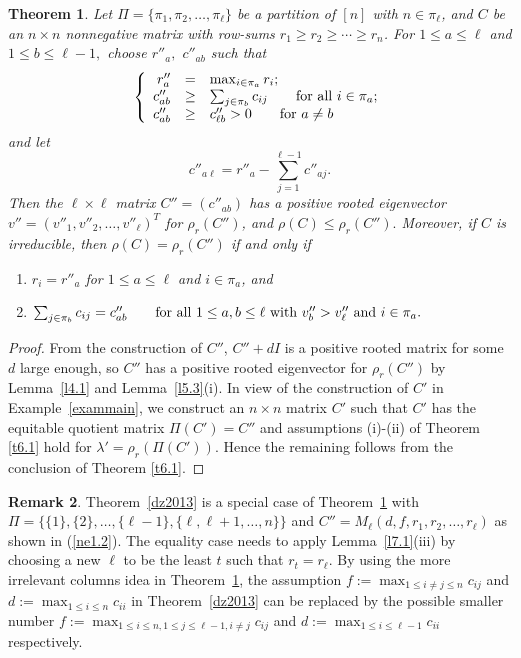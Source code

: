 \documentclass[final,3p, times, 12pt]{elsarticle}
\theoremstyle{plain}
\newtheorem{thm}{Theorem}[section]
\theoremstyle{definition}
\newtheorem{rem}[thm]{Remark}
\theoremstyle{remark}
\numberwithin{equation}{section}
\begin{document}
\begin{thm}\label{main3}
Let  $\Pi=\{\pi_1, \pi_2, \ldots, \pi_\ell\}$ be a partition of $[n]$ with $n\in \pi_\ell$, and
$C$ be an $n\times n$ nonnegative matrix with row-sums $r_1\geq r_2\geq \cdots \geq r_n$.
For $1\leq a \leq \ell$ and $1\leq b\leq \ell-1,$
choose  $r''_a,$ $c''_{ab}$ such that
$$
\left\{
\begin{array}{rcl}
r''_a&=&\max_{i\in \pi_a} r_i;\\
c''_{ab}   &\geq&\sum_{j\in \pi_b} c_{ij}\qquad \hbox{for all } i\in \pi_a;\\
c''_{ab}   &\geq& c''_{\ell b}> 0 \qquad \hbox{for } a\not=b
\end{array}
\right.$$
and let
$$c''_{a\ell}=r''_a-\sum_{j=1}^{\ell-1} c''_{aj}.$$
Then the $\ell\times\ell$ matrix $C''=(c''_{ab})$  has a positive rooted eigenvector $v''=(v''_1, v''_2, \ldots, v''_\ell)^T$ for $\rho_r(C'')$,
and  $\rho(C)\leq \rho_r(C'').$
Moreover, if $C$ is irreducible, then $\rho(C)= \rho_r(C'')$ if and only if
\begin{enumerate}
\item[(a)] $r_i=r''_a$ \qquad for $1\leq a\leq \ell$ and $i\in \pi_a$, and
\item[(b)]
$\sum_{j\in \pi_b}c_{ij} =c''_{ab}\qquad \hbox{for all $1\leq a, b\leq \ell$ with $v''_b>v''_\ell$ and  $i\in \pi_a$}.$
\end{enumerate}
\end{thm}

\begin{proof} From the construction of $C''$,
$C''+dI$ is a positive rooted matrix for some $d$ large enough, so $C''$ has a positive rooted eigenvector for $\rho_r(C'')$ by Lemma~\ref{l4.1} and Lemma~\ref{l5.3}(i).
In view of the construction of $C'$ in Example~\ref{exammain}, we construct an $n\times n$ matrix $C'$ such that $C'$ has the equitable quotient matrix $\Pi(C')=C''$ and assumptions (i)-(ii) of Theorem \ref{t6.1} hold for $\lambda'=\rho_r(\Pi(C'))$.
Hence the remaining follows from the conclusion of Theorem \ref{t6.1}.
\end{proof}

\begin{rem}
Theorem~\ref{dz2013} is a special case  of Theorem~\ref{main3} with $\Pi=\{\{1\}, \{2\}, \ldots, \{\ell-1\}, \{\ell, \ell+1, \ldots, n\}\}$ and $C''=M_{\ell}(d,f,r_1,r_2,\ldots,r_\ell)$ as shown in (\ref{ne1.2}). The equality case needs to apply Lemma~\ref{l7.1}(iii) by choosing a new $\ell$ to be the least $t$ such that $r_t=r_\ell$.
By using the more irrelevant columns idea in Theorem~\ref{main3}, the assumption  $f:=\max_{1\leq i\not=j\leq n} c_{ij}$ and $d:=\max_{1\leq i\leq n}c_{ii}$ in Theorem~\ref{dz2013} can be replaced by the possible smaller number $f:=\max_{1\leq i\leq n,1\leq j\leq \ell-1,i\ne j} c_{ij}$ and $d:=\max_{1\leq i\leq \ell-1} c_{ii}$ respectively.
\end{rem}
\end{document}
